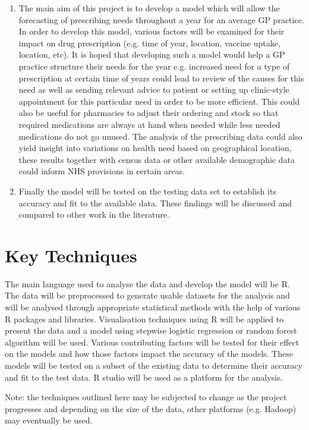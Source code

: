 \begin{enumerate}
    \item The main aim of this project is to develop a model which will allow the forecasting of prescribing needs throughout a year for an average GP practice. In order to develop this model, various factors will be examined for their impact on drug prescription (e.g. time of year, location, vaccine uptake, location, etc). It is hoped that developing such a model would help a GP practice structure their needs for the year e.g. increased need for a type of prescription at certain time of years could lead to review of the causes for this need as well as sending relevant advice to patient or setting up clinic-style appointment for this particular need in order to be more efficient. This could also be useful for pharmacies to adjust their ordering and stock so that required medications are always at hand when needed while less needed medications do not go unused.
    The analysis of the prescribing data could also yield insight into variations on health need based on geographical location, these results together with census data or other available demographic data could inform NHS provisions in certain areas.
    
    \item Finally the model will be tested on the testing data set to establish its accuracy and fit to the available data. These findings will be discussed and compared to other work in the literature.
\end{enumerate}
\section{Key Techniques}
The main language used to analyse the data and develop the model will be R.
The data will be preprocessed to generate usable datasets for the analysis and will be analysed through appropriate statistical methods with the help of various R packages and libraries.
Visualisation techniques using R will be applied to present the data and a model using stepwise logistic regression or random forest algorithm will be used. 
Various contributing factors will be tested for their effect on the models and how those factors impact the accuracy of the models. These models will be tested on a subset of the existing data to determine their accuracy and fit to the test data. 
R studio will be used as a platform for the analysis.

Note: the techniques outlined here may be subjected to change as the project progresses and depending on the size of the data, other platforms (e.g. Hadoop) may eventually be used.

